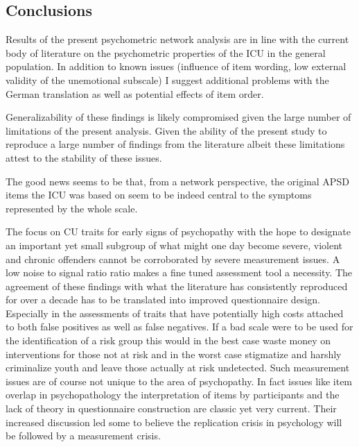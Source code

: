  
 
 \subsection{Conclusions}
 Results of the present psychometric network analysis are in line with the current body of literature on the psychometric properties of the ICU in the general population.
 In addition to known issues (influence of item wording, low external validity of the unemotional subscale) I suggest additional problems with the German translation as well as potential effects of item order.
 
 Generalizability of these findings is likely compromised given the large number of limitations of the present analysis.
 Given the ability of the present study to reproduce a large number of findings from the literature albeit these limitations attest to the stability of these issues.  
 
 The good news seems to be that, from a network perspective, the original APSD items the ICU was based on seem to be indeed central to the symptoms represented by the whole scale.   
 
 The focus on CU traits for early signs of psychopathy with the hope to designate an important yet small subgroup of what might one day become severe, violent and chronic offenders cannot be corroborated by severe measurement issues. 
 A low noise to signal ratio ratio makes a fine tuned assessment tool a necessity. 
 The agreement of these findings with what the literature has consistently reproduced for over a decade has to be translated into improved questionnaire design. 
 Especially in the assessments of traits that have potentially high costs attached to both false positives as well as false negatives. If a bad scale were to be used for the identification of a risk group this would in the best case waste money on interventions for those not at risk and in the worst case stigmatize and harshly criminalize youth and leave those actually at risk undetected. Such measurement issues are of course not unique to the area of psychopathy. In fact issues like item overlap in psychopathology the interpretation of items by participants and the lack of theory in questionnaire construction are classic yet very current. Their increased discussion led some to believe the replication crisis in psychology will be followed by a measurement crisis. 
 

